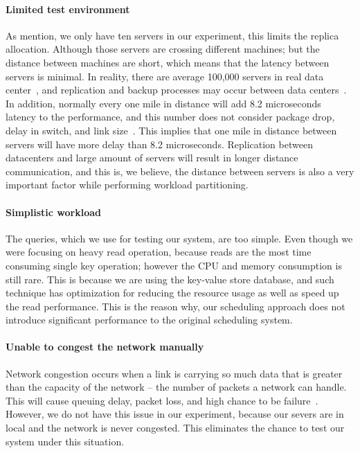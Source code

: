 \paragraph{Limited test environment}
As mention, we only have ten servers in our experiment, this limits the replica allocation. Although those servers are crossing different machines; but the distance between machines are short, which means that the latency between servers is minimal. In reality, there are average 100,000 servers in real data center~\cite{Guo:2010:SDC:1921168.1921188}, and replication and backup processes may occur between data centers~\cite{F5-Accelerate}. In addition, normally every one mile in distance will add 8.2 microseconds latency to the performance, and this number does not consider package drop, delay in switch, and link size~\cite{Cisco-Latency}. This implies that one mile in distance between servers will have more delay than 8.2 microseconds. Replication between datacenters and large amount of servers will result in longer distance communication, and this is, we believe, the distance between servers is also a very important factor while performing workload partitioning.
 
\paragraph{Simplistic workload}
The queries, which we use for testing our system, are too simple. Even though we were focusing on heavy read operation, because reads are the most time consuming single key operation; however the CPU and memory consumption is still rare. This is because we are using the key-value store database, and such technique has optimization for reducing the resource usage as well as speed up the read performance. This is the reason why, our scheduling approach does not introduce significant performance to the original scheduling system.
 
\paragraph{Unable to congest the network manually}
Network congestion occurs when a link is carrying so much data that is greater than the capacity of the network – the number of packets a network can handle. This will cause queuing delay, packet loss, and high chance to be failure~\cite{103559}. However, we do not have this issue in our experiment, because our severs are in local and the network is never congested. This eliminates the chance to test our system under this situation.
 
